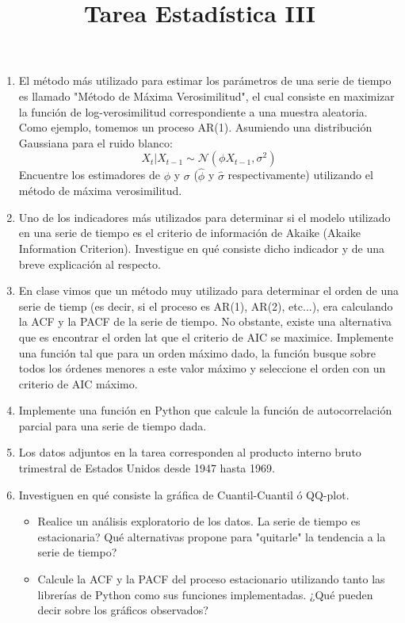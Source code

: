 \documentclass[10pt,a4paper]{article}
\title{Tarea Estadística III}
\begin{document}
\maketitle	

\begin{enumerate}
\item El método más utilizado para estimar los parámetros de una serie de tiempo es llamado "Método de Máxima Verosimilitud", el cual consiste en 
        maximizar la función de log-verosimilitud correspondiente a una muestra aleatoria. Como ejemplo, 
        tomemos un proceso AR(1). Asumiendo una distribución Gaussiana para el ruido blanco:
        \begin{equation}
            X_t \vert X_{t-1} \sim \mathcal{N}\left(\phi X_{t-1}, \sigma^2\right)
        \end{equation}
        Encuentre los estimadores de $\phi$ y $\sigma$ ($\hat{\phi}$ y $\hat{\sigma}$ respectivamente) utilizando el método de máxima verosimilitud.
\item Uno de los indicadores más utilizados para determinar si el modelo utilizado en una serie de tiempo es el criterio de información de Akaike (Akaike Information Criterion). Investigue en qué consiste dicho indicador y de una breve explicación al respecto.
\item En clase vimos que un método muy utilizado para determinar el orden de una serie de tiemp (es decir, si el proceso es AR(1), AR(2), etc...), era calculando la ACF y la PACF de la serie de tiempo. No obstante, existe una alternativa que es encontrar el orden lat que el criterio de AIC se maximice. 
        Implemente una función tal que para un orden máximo dado, la función busque sobre todos los órdenes menores a este valor máximo y seleccione el orden con un criterio de AIC máximo.
\item Implemente una función en Python que calcule la función de autocorrelación parcial para una serie de tiempo dada.
\item Los datos adjuntos en la tarea corresponden al producto interno bruto trimestral de Estados Unidos desde 1947 hasta 1969.
\item Investiguen en qué consiste la gráfica de Cuantil-Cuantil ó QQ-plot.
        \begin{itemize}
            \item Realice un análisis exploratorio de los datos. La serie de tiempo es estacionaria? Qué alternativas propone para "quitarle" la tendencia a la serie de tiempo?
            \item Calcule la ACF y la PACF del proceso estacionario utilizando tanto las librerías de Python como sus funciones implementadas. ¿Qué pueden decir sobre los gráficos observados?

\end{itemize}
\end{enumerate}
\end{document}
